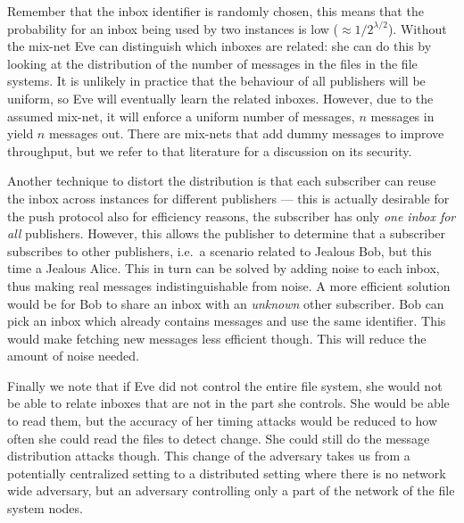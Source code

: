Remember that the inbox identifier is randomly chosen, this means that the 
probability for an inbox being used by two instances is low (\(\approx 
  1/2^{\lambda/2}\)).
Without the mix-net Eve can distinguish which inboxes are related:
she can do this by looking at the distribution of the number of messages in the 
files in the file systems.
It is unlikely in practice that the behaviour of all publishers will be 
uniform, so Eve will eventually learn the related inboxes.
However, due to the assumed mix-net, it will enforce a uniform number of 
messages, \(n\) messages in yield \(n\) messages out.
There are mix-nets that add dummy messages to improve throughput, but we refer 
to that literature for a discussion on its security.

Another technique to distort the distribution is that each subscriber can reuse 
the inbox across instances for different publishers --- this is actually 
desirable for the push protocol also for efficiency reasons, the subscriber has 
only \emph{one inbox for all} publishers.
However, this allows the publisher to determine that a subscriber subscribes to 
other publishers, i.e.\ a scenario related to Jealous Bob, but this time 
a Jealous Alice.
This in turn can be solved by adding noise to each inbox, thus making real 
messages indistinguishable from noise.
A more efficient solution would be for Bob to share an inbox with an 
\emph{unknown} other subscriber.
Bob can pick an inbox which already contains messages and use the same 
identifier.
This would make fetching new messages less efficient though.
This will reduce the amount of noise needed.

Finally we note that if Eve did not control the entire file system, she would 
not be able to relate inboxes that are not in the part she controls.
She would be able to read them, but the accuracy of her timing attacks would be
reduced to how often she could read the files to detect change.
She could still do the message distribution attacks though.
This change of the adversary takes us from a potentially centralized setting to 
a distributed setting where there is no network wide adversary, but an 
adversary controlling only a part of the network of the file system nodes.

